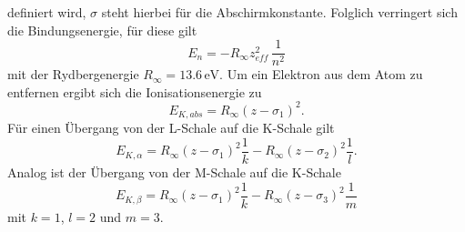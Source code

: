 definiert wird, $\sigma$ steht hierbei für die Abschirmkonstante.
Folglich verringert sich die Bindungsenergie, für diese gilt
\begin{equation}
    E_n = -R_{\infty} z_{eff}^2  \, \frac{1}{n^2}
\end{equation}
mit der Rydbergenergie $R_{\infty} = 13.6 \, \unit{\eV}$. Um ein Elektron aus 
dem Atom zu entfernen ergibt sich die Ionisationsenergie zu
\begin{equation}
    \label{eqn:a}
    E_{K,abs} = R_{\infty} (z - \sigma_1)^2.
\end{equation}
Für einen Übergang von der L-Schale auf die K-Schale gilt 
\begin{equation}
    \label{eqn:b}
    E_{K,\alpha} = R_{\infty} (z - \sigma_1)^2 \frac{1}{k} - R_{\infty} (z - \sigma_2)^2 \frac{1}{l}.
\end{equation}
Analog ist der Übergang von der M-Schale auf die K-Schale 
\begin{equation}
    \label{eqn:c}
    E_{K,\beta} = R_{\infty} (z - \sigma_1)^2 \frac{1}{k} - R_{\infty} (z - \sigma_3)^2 \frac{1}{m}
\end{equation}
mit $k = 1$, $l = 2$ und $m = 3$.

